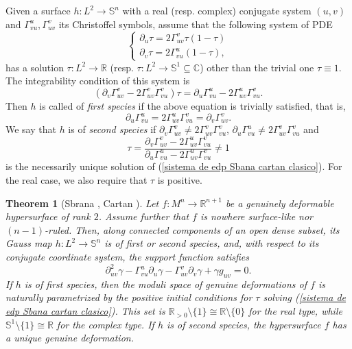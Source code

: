 \documentclass{article}
\newtheorem{thm}{Theorem}[section]
\theoremstyle{remark}
\begin{document}
Given a surface $h:L^2\rightarrow\mathbb{S}^n$ with a real (resp. complex) conjugate system $(u,v)$ and $\Gamma_{vu}^u, \Gamma_{uv}^v$ its Christoffel symbols, assume that the following system of PDE
\begin{equation}\label{sistema de edp Sbana cartan clasico}
    \left\{ \begin{array}{lr}
        \partial_u\tau=2\Gamma_{uv}^v\tau(1-\tau)\\
        \partial_v\tau=2\Gamma_{vu}^u(1-\tau),
    \end{array}\right.
\end{equation}
has a solution $\tau:L^2\rightarrow\mathbb{R}$ (resp. $\tau:L^2\rightarrow\mathbb{S}^1\subseteq\mathbb{C}$) other than the trivial one $\tau\equiv 1$. The integrability condition of this system is
\begin{equation}
    (\partial_v\Gamma_{uv}^v-2\Gamma_{uv}^v\Gamma_{vu}^v)\tau=\partial_u\Gamma_{vu}^u-2\Gamma_{uv}^u\Gamma_{vu}^v.
\end{equation}
Then $h$ is called of {\it first species} if the above equation is trivially satisfied, that is,
\begin{equation}
    \partial_u\Gamma_{vu}^u=2\Gamma_{uv}^u\Gamma_{vu}^v=\partial_v\Gamma_{uv}^v.
\end{equation}
We say that $h$ is of {\it second species} if $\partial_v\Gamma_{uv}^v\neq 2\Gamma_{uv}^v\Gamma_{vu}^v$, $\partial_u\Gamma_{vu}^u\neq 2\Gamma_{uv}^v\Gamma_{vu}^v$ and
\begin{equation}\label{solucion segunda especie sbrana cartan clasico}
    \tau=\frac{\partial_v\Gamma_{uv}^v-2\Gamma_{uv}^u\Gamma_{vu}^v}{\partial_u\Gamma_{vu}^u-2\Gamma_{uv}^u\Gamma_{vu}^v}\neq 1 
\end{equation}
is the necessarily unique solution of (\ref{sistema de edp Sbana cartan clasico}). For the real case, we also require that $\tau$ is positive.

\begin{thm}[Sbrana \cite{Sb}, Cartan \cite{Ca}]
    Let $f:M^n\rightarrow\mathbb{R}^{n+1}$ be a genuinely deformable hypersurface of rank $2$. Assume further that $f$ is nowhere surface-like nor $(n-1)$-ruled. Then, along connected components of an open dense subset, its Gauss map $h:L^2\rightarrow\mathbb{S}^n$ is of first or second species, and, with respect to its conjugate coordinate system, the support function satisfies 
    \begin{equation*}
        \partial^2_{uv}\gamma-\Gamma_{vu}^u\partial_u\gamma-\Gamma_{uv}^v\partial_v\gamma+\gamma g_{uv}=0.
    \end{equation*}
    If $h$ is of first species, then the moduli space of genuine deformations of $f$ is naturally parametrized by the positive initial conditions for $\tau$ solving (\ref{sistema de edp Sbana cartan clasico}). This set is $\mathbb{R}_{>0}\setminus\{1\}\cong\mathbb{R}\setminus\{0\}$ for the real type, while $\mathbb{S}^{1}\setminus\{1\}\cong\mathbb{R}$ for the complex type. If $h$ is of second species, the hypersurface $f$ has a unique genuine deformation.
\end{thm}
\end{document}
